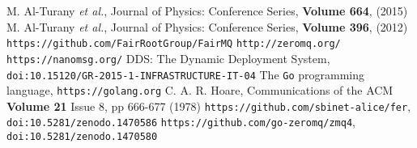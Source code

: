 \documentclass{webofc}
\begin{document}
\begin{thebibliography}{}

 M. Al-Turany \emph{et al.}, Journal of Physics: Conference Series, \textbf{Volume 664}, (2015)
 M. Al-Turany \emph{et al.}, Journal of Physics: Conference Series, \textbf{Volume 396}, (2012)
 \texttt{https://github.com/FairRootGroup/FairMQ}
 \texttt{http://zeromq.org/}
 \texttt{https://nanomsg.org/}
 DDS: The Dynamic Deployment System, \texttt{doi:10.15120/GR-2015-1-INFRASTRUCTURE-IT-04}
 The \texttt{Go} programming language, \texttt{https://golang.org}
 C. A. R. Hoare, Communications of the ACM \textbf{Volume 21} Issue 8, pp 666-677 (1978)
 \texttt{https://github.com/sbinet-alice/fer}, \texttt{doi:10.5281/zenodo.1470586}
 \texttt{https://github.com/go-zeromq/zmq4}, \texttt{doi:10.5281/zenodo.1470580}

\end{thebibliography}
\end{document}
